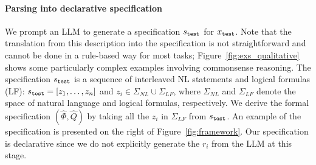 \documentclass{article}
\theoremstyle{definition}
\newcommand{\greg}[1]{\textcolor{red}{\textbf{GREG:} #1}}
\newcommand{\spec}{\Phi}
\newcommand{\query}{Q}
\begin{document}
\paragraph{Parsing into declarative specification}
We prompt an LLM to generate a specification $s_{\tt test}$ for $x_{\tt test}$. Note that the translation from this description into the specification is not straightforward and cannot be done in a rule-based way for most tasks; Figure~\ref{fig:exs_qualitative} shows some particularly complex examples involving commonsense reasoning. The specification $s_{\tt test}$ is a sequence of interleaved NL statements and logical formulas (LF): $s_{\tt test}=[z_1,\ldots,z_n]$ and $z_i\in \Sigma_{NL}\cup \Sigma_{LF}$, where $\Sigma_{NL}$ and $\Sigma_{LF}$ denote the space of natural language and logical formulas, respectively.  We derive the formal specification $(\hat{\spec},\hat{\query})$ by taking all the $z_i$ in $\Sigma_{LF}$ from $s_{\tt test}$.
An example of the specification is presented on the right of Figure~\ref{fig:framework}.
Our specification is declarative since we do not explicitly generate the $r_i$ from the LLM at this stage. %
\end{document}
